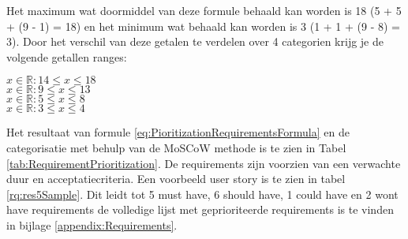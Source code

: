 \whitespace
Het maximum wat doormiddel van deze formule behaald kan worden is 18 (5 + 5 + (9 - 1) = 18) en het minimum wat behaald kan worden is 3 (1 + 1 + (9 - 8) = 3).
Door het verschil van deze getalen te verdelen over 4 categorien krijg je de volgende getallen ranges:

\whitespace
{} $ x \in \mathbb{R} : 14 \leq x \leq 18 $ \\
 $ x \in \mathbb{R} : 9 \leq x \leq 13 $ \\
 $ x \in \mathbb{R} :  5 \leq x \leq 8 $ \\
 $ x \in \mathbb{R} : 3 \leq x \leq 4 $

\newpage
\whitespace
Het resultaat van formule \ref{eq:PioritizationRequirementsFormula} en de categorisatie met behulp van de MoSCoW methode is te zien in Tabel \ref{tab:RequirementPrioritization}. %
De requirements zijn voorzien van een verwachte duur en acceptatiecriteria.
Een voorbeeld user story is te zien in tabel \ref{rq:res5Sample}.
Dit leidt tot 5 must have, 6 should have, 1 could have en 2 wont have requirements de volledige lijst met geprioriteerde requirements is te vinden in bijlage \ref{appendix:Requirements}.

